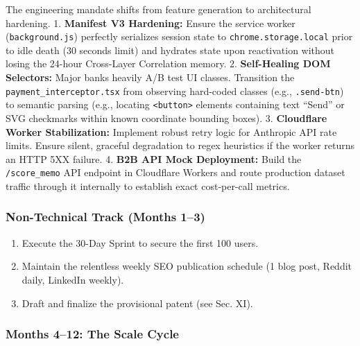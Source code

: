 \documentclass[
]{article}
\providecommand{\tightlist}{%
  \setlength{\itemsep}{0pt}\setlength{\parskip}{0pt}}
\begin{document}
The engineering mandate shifts from feature generation to architectural
hardening. 1. \textbf{Manifest V3 Hardening:} Ensure the service worker
(\texttt{background.js}) perfectly serializes session state to
\texttt{chrome.storage.local} prior to idle death (30 seconds limit) and
hydrates state upon reactivation without losing the 24-hour Cross-Layer
Correlation memory. 2. \textbf{Self-Healing DOM Selectors:} Major banks
heavily A/B test UI classes. Transition the
\texttt{payment\_interceptor.tsx} from observing hard-coded classes
(e.g., \texttt{.send-btn}) to semantic parsing (e.g., locating
\texttt{\textless{}button\textgreater{}} elements containing text
``Send'' or SVG checkmarks within known coordinate bounding boxes). 3.
\textbf{Cloudflare Worker Stabilization:} Implement robust retry logic
for Anthropic API rate limits. Ensure silent, graceful degradation to
regex heuristics if the worker returns an HTTP 5XX failure. 4.
\textbf{B2B API Mock Deployment:} Build the \texttt{/score\_memo} API
endpoint in Cloudflare Workers and route production dataset traffic
through it internally to establish exact cost-per-call metrics.

\subsubsection{Non-Technical Track (Months
1--3)}\label{non-technical-track-months-13}

\begin{enumerate}
\def\labelenumi{\arabic{enumi}.}
\tightlist
\item
  Execute the 30-Day Sprint to secure the first 100 users.
\item
  Maintain the relentless weekly SEO publication schedule (1 blog post,
  Reddit daily, LinkedIn weekly).
\item
  Draft and finalize the provisional patent (see Sec. XI).
\end{enumerate}

\subsubsection{Months 4--12: The Scale
Cycle}\label{months-412-the-scale-cycle}
\end{document}
